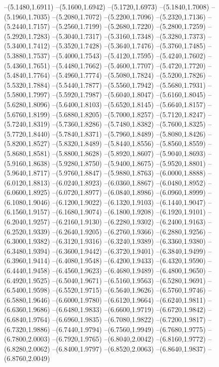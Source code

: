 {\begin{scope}
--(5.1480,1.6911)
--(5.1600,1.6942)
--(5.1720,1.6973)
--(5.1840,1.7008)
--(5.1960,1.7035)
--(5.2080,1.7072)
--(5.2200,1.7096)
--(5.2320,1.7136)
--(5.2440,1.7157)
--(5.2560,1.7199)
--(5.2680,1.7220)
--(5.2800,1.7259)
--(5.2920,1.7283)
--(5.3040,1.7317)
--(5.3160,1.7348)
--(5.3280,1.7373)
--(5.3400,1.7412)
--(5.3520,1.7428)
--(5.3640,1.7476)
--(5.3760,1.7485)
--(5.3880,1.7537)
--(5.4000,1.7543)
--(5.4120,1.7595)
--(5.4240,1.7602)
--(5.4360,1.7651)
--(5.4480,1.7662)
--(5.4600,1.7707)
--(5.4720,1.7720)
--(5.4840,1.7764)
--(5.4960,1.7774)
--(5.5080,1.7824)
--(5.5200,1.7826)
--(5.5320,1.7884)
--(5.5440,1.7877)
--(5.5560,1.7942)
--(5.5680,1.7931)
--(5.5800,1.7997)
--(5.5920,1.7987)
--(5.6040,1.8047)
--(5.6160,1.8045)
--(5.6280,1.8096)
--(5.6400,1.8103)
--(5.6520,1.8145)
--(5.6640,1.8157)
--(5.6760,1.8199)
--(5.6880,1.8205)
--(5.7000,1.8257)
--(5.7120,1.8247)
--(5.7240,1.8319)
--(5.7360,1.8286)
--(5.7480,1.8382)
--(5.7600,1.8325)
--(5.7720,1.8440)
--(5.7840,1.8371)
--(5.7960,1.8489)
--(5.8080,1.8426)
--(5.8200,1.8527)
--(5.8320,1.8489)
--(5.8440,1.8556)
--(5.8560,1.8559)
--(5.8680,1.8581)
--(5.8800,1.8628)
--(5.8920,1.8607)
--(5.9040,1.8693)
--(5.9160,1.8638)
--(5.9280,1.8750)
--(5.9400,1.8675)
--(5.9520,1.8801)
--(5.9640,1.8717)
--(5.9760,1.8847)
--(5.9880,1.8763)
--(6.0000,1.8888)
--(6.0120,1.8813)
--(6.0240,1.8923)
--(6.0360,1.8867)
--(6.0480,1.8952)
--(6.0600,1.8925)
--(6.0720,1.8977)
--(6.0840,1.8986)
--(6.0960,1.8999)
--(6.1080,1.9046)
--(6.1200,1.9022)
--(6.1320,1.9103)
--(6.1440,1.9047)
--(6.1560,1.9157)
--(6.1680,1.9074)
--(6.1800,1.9208)
--(6.1920,1.9101)
--(6.2040,1.9257)
--(6.2160,1.9130)
--(6.2280,1.9302)
--(6.2400,1.9163)
--(6.2520,1.9339)
--(6.2640,1.9205)
--(6.2760,1.9366)
--(6.2880,1.9256)
--(6.3000,1.9382)
--(6.3120,1.9316)
--(6.3240,1.9389)
--(6.3360,1.9380)
--(6.3480,1.9394)
--(6.3600,1.9442)
--(6.3720,1.9401)
--(6.3840,1.9499)
--(6.3960,1.9414)
--(6.4080,1.9548)
--(6.4200,1.9433)
--(6.4320,1.9590)
--(6.4440,1.9458)
--(6.4560,1.9623)
--(6.4680,1.9489)
--(6.4800,1.9650)
--(6.4920,1.9525)
--(6.5040,1.9671)
--(6.5160,1.9563)
--(6.5280,1.9691)
--(6.5400,1.9598)
--(6.5520,1.9715)
--(6.5640,1.9626)
--(6.5760,1.9746)
--(6.5880,1.9646)
--(6.6000,1.9780)
--(6.6120,1.9664)
--(6.6240,1.9811)
--(6.6360,1.9686)
--(6.6480,1.9833)
--(6.6600,1.9719)
--(6.6720,1.9842)
--(6.6840,1.9764)
--(6.6960,1.9835)
--(6.7080,1.9822)
--(6.7200,1.9817)
--(6.7320,1.9886)
--(6.7440,1.9794)
--(6.7560,1.9949)
--(6.7680,1.9775)
--(6.7800,2.0003)
--(6.7920,1.9765)
--(6.8040,2.0042)
--(6.8160,1.9772)
--(6.8280,2.0062)
--(6.8400,1.9797)
--(6.8520,2.0063)
--(6.8640,1.9837)
--(6.8760,2.0049)

\end{scope}}
